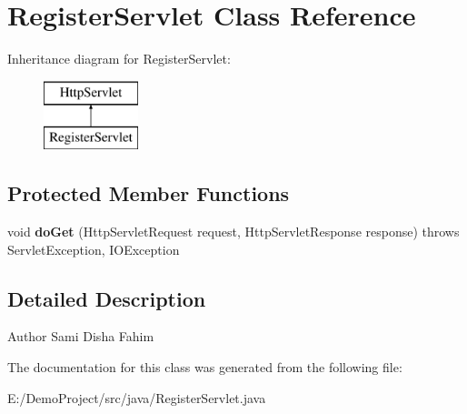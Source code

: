 \section{Register\+Servlet Class Reference}
\label{class_register_servlet}
Inheritance diagram for Register\+Servlet\+:\begin{figure}[H]
\begin{center}
\leavevmode
\includegraphics[height=2.000000cm]{class_register_servlet}
\end{center}
\end{figure}
\subsection*{Protected Member Functions}
\begin{DoxyCompactItemize}
\item 
\mbox{\label{class_register_servlet_aea26b7669078b9e477c23c2136a5b5d1}} 
void {\bfseries do\+Get} (Http\+Servlet\+Request request, Http\+Servlet\+Response response)  throws Servlet\+Exception, I\+O\+Exception 
\end{DoxyCompactItemize}


\subsection{Detailed Description}
\begin{DoxyAuthor}{Author}
Sami Disha Fahim 
\end{DoxyAuthor}


The documentation for this class was generated from the following file\+:\begin{DoxyCompactItemize}
\item 
E\+:/\+Demo\+Project/src/java/Register\+Servlet.\+java\end{DoxyCompactItemize}
